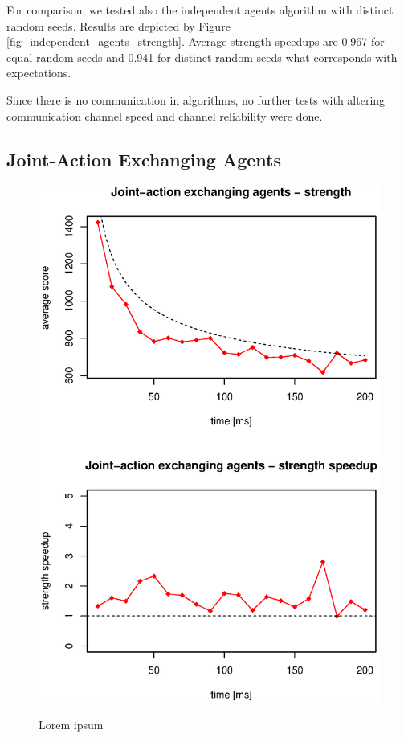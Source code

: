 For comparison, we tested also the independent agents algorithm with distinct random seeds.
Results are depicted by Figure \ref{fig_independent_agents_strength}. Average strength speedups
are 0.967 for equal random seeds and 0.941 for distinct random seeds what corresponds with
expectations.

Since there is no communication in algorithms, no further tests with altering communication
channel speed and channel reliability were done.


\subsection{Joint-Action Exchanging Agents}

\begin{figure}
\begin{center}
\includegraphics{img/move-exchange-strength.eps}
\end{center}
\caption{\footnotesize Lorem ipsum}{\footnotesize }
\label{fig_action_exchanging_strength}
\end{figure}

